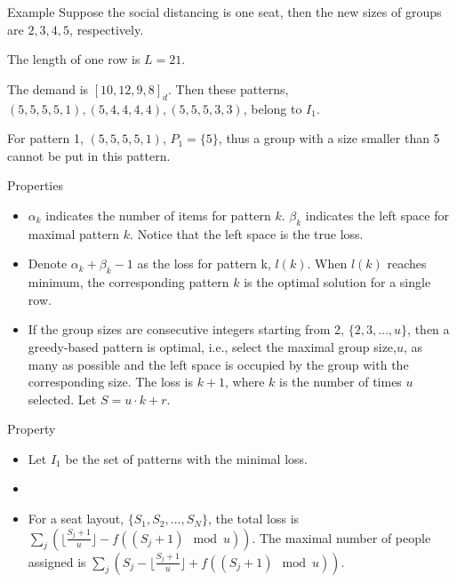   \begin{frame}{Example}
    Suppose the social distancing is one seat, then the new sizes of groups are $2, 3, 4, 5$, respectively. 
    
    The length of one row is $L = 21$.
    
    The demand is $[10, 12, 9, 8]_d$. Then these patterns, $(5, 5, 5, 5, 1), (5, 4, 4, 4, 4),(5, 5, 5, 3, 3)$, belong to $I_1$. 
    
    For pattern 1, $(5, 5, 5, 5, 1)$, $P_{1} = \{5\}$, thus a group with a size smaller than 5 cannot be put in this pattern.
  \end{frame}

  \begin{frame}{Properties}
    \begin{itemize}
      \item $\alpha_k$ indicates the number of items for pattern $k$. $\beta_k$ indicates the left space for maximal pattern $k$. Notice that the left space is the true loss.
      \item Denote $\alpha_k + \beta_k- 1$ as the loss for pattern k, $l(k)$. When $l(k)$ reaches minimum, the corresponding pattern $k$ is the optimal solution for a single row.
      \item If the group sizes are consecutive integers starting from 2, $\{2,3,\ldots,u\}$, then a greedy-based pattern is optimal, i.e., select the maximal group size,$u$, as many as possible and the left space is occupied by the group with the corresponding size. The loss is $k+1$, where $k$ is the number of times $u$ selected. Let $S = u\cdot k + r$.
    \end{itemize}
  \end{frame}

  \begin{frame}{Property}
    \begin{itemize}
      \item Let $I_1$ be the set of patterns with the minimal loss.
      \item 
      \item For a seat layout, $\{S_1, S_2, \ldots, S_{N}\}$, the total loss is $\sum_{j} (\lfloor \frac{S_j+1}{u} \rfloor - f((S_j +1)\mod u))$. The maximal number of people assigned is $\sum_{j} (S_j - \lfloor \frac{S_j+1}{u} \rfloor + f((S_j +1)\mod u))$.
    \end{itemize}
  \end{frame}
  
